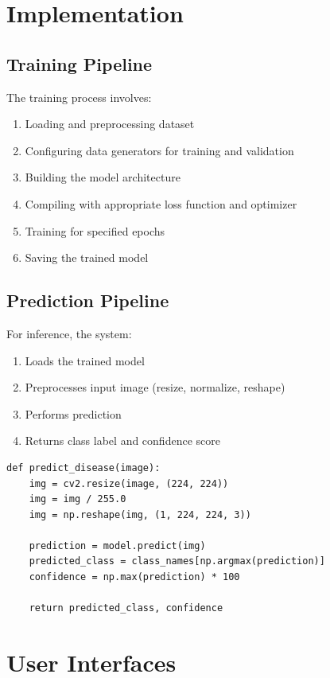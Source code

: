\documentclass[12pt,a4paper]{article}
\begin{document}
\section{Implementation}

\subsection{Training Pipeline}
The training process involves:
\begin{enumerate}
    \item Loading and preprocessing dataset
    \item Configuring data generators for training and validation
    \item Building the model architecture
    \item Compiling with appropriate loss function and optimizer
    \item Training for specified epochs
    \item Saving the trained model
\end{enumerate}

\subsection{Prediction Pipeline}
For inference, the system:
\begin{enumerate}
    \item Loads the trained model
    \item Preprocesses input image (resize, normalize, reshape)
    \item Performs prediction
    \item Returns class label and confidence score
\end{enumerate}

\begin{lstlisting}[caption=Prediction Function]
def predict_disease(image):
    img = cv2.resize(image, (224, 224))
    img = img / 255.0
    img = np.reshape(img, (1, 224, 224, 3))
    
    prediction = model.predict(img)
    predicted_class = class_names[np.argmax(prediction)]
    confidence = np.max(prediction) * 100
    
    return predicted_class, confidence
\end{lstlisting}

\section{User Interfaces}
\end{document}
